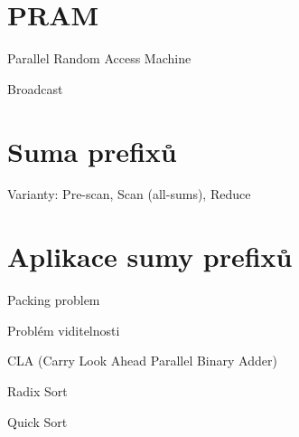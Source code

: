 
\section{PRAM}

\begin{compactitem}
    \item Parallel Random Access Machine
    \item Broadcast
    \item {}
\end{compactitem}


\section{Suma prefixů}

\begin{compactitem}
    \item Varianty: Pre-scan, Scan (all-sums), Reduce

    \item {}
\end{compactitem}


\section{Aplikace sumy prefixů}

\begin{compactitem}
    \item Packing problem
    \item Problém viditelnosti
    \item CLA (Carry Look Ahead Parallel Binary Adder)
    \item Radix Sort
    \item Quick Sort
    \item {}
\end{compactitem}
